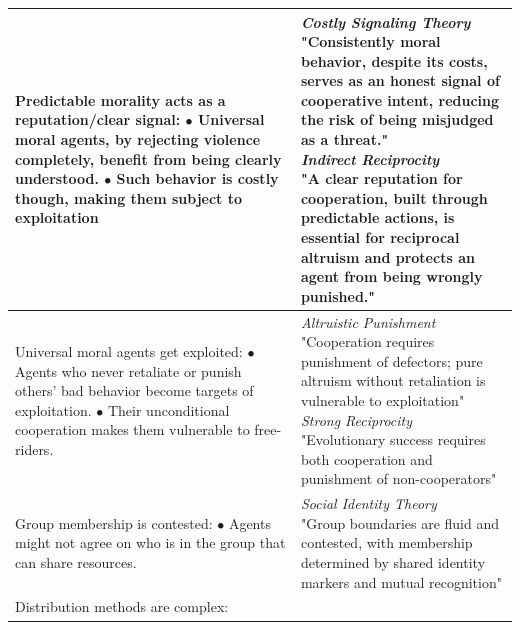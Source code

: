 \begin{table}[ht]
\begin{tabular}{p{8.5cm}p{8.5cm}}
\hline
\parbox[t]{8.5cm}{Predictable morality acts as a reputation/clear signal: \\
\hspace*{1em} $\bullet$ Universal moral agents, by rejecting violence completely, benefit from being clearly understood. \\
\hspace*{1em} $\bullet$ Such behavior is costly though, making them subject to exploitation} &
\parbox[t]{8.5cm}{\textit{Costly Signaling Theory} \citep{gintis2001costly} \\
"Consistently moral behavior, despite its costs, serves as an honest signal of cooperative intent, reducing the risk of being misjudged as a threat." \\
\textit{Indirect Reciprocity} \citep{nowak2005evolution} \\
"A clear reputation for cooperation, built through predictable actions, is essential for reciprocal altruism and protects an agent from being wrongly punished."} \\
\hline
\parbox[t]{8.5cm}{Universal moral agents get exploited: \\
\hspace*{1em} $\bullet$ Agents who never retaliate or punish others' bad behavior become targets of exploitation. \\
\hspace*{1em} $\bullet$ Their unconditional cooperation makes them vulnerable to free-riders.} & 
\parbox[t]{8.5cm}{\textit{Altruistic Punishment} \citep{fehr2002altruistic} \\
"Cooperation requires punishment of defectors; pure altruism without retaliation is vulnerable to exploitation" \\
\textit{Strong Reciprocity} \citep{bowles2004evolution} \\
"Evolutionary success requires both cooperation and punishment of non-cooperators"} \\
\hline
\parbox[t]{8.5cm}{Group membership is contested: \\
\hspace*{1em} $\bullet$ Agents might not agree on who is in the group that can share resources.} & 
\parbox[t]{8.5cm}{\textit{Social Identity Theory} \citep{tajfel1979individuals} \\
"Group boundaries are fluid and contested, with membership determined by shared identity markers and mutual recognition"} \\
\hline
\parbox[t]{8.5cm}{Distribution methods are complex: \\
}
\end{tabular}
\end{table}
